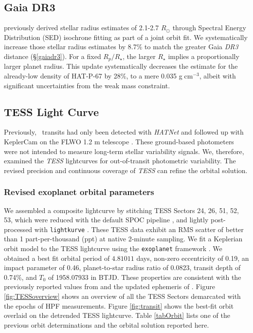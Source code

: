 \documentclass[twocolumn]{aastex631}
\newcommand{\hatpb}{\object{HAT-P-67 b}}
\begin{document}
\subsection{Gaia DR3}\label{analysisgaiaDR3}
\citet{2017AJ....153..211Z} previously derived stellar radius estimates of 2.1-2.7 $R_\odot$ through Spectral Energy Distribution (SED) isochrone fitting as part of a joint orbit fit.  We systematically increase those stellar radius estimates by 8.7\% to match the greater Gaia \emph{DR3} distance (\S \ref{gaiadr3}).  For a fixed $R_p/R_\star$, the larger $R_\star$ implies a proportionally larger planet radius. This update systematically decreases the estimate for the already-low density of HAT-P-67 by 28\%, to a mere 0.035 g$\;$cm$^{-3}$, albeit with significant uncertainties from the weak mass constraint.

\subsection{TESS Light Curve}
Previously, \hatpb~transits had only been detected with \emph{HATNet} \citep{2004PASP..116..266B} and followed up with KeplerCam on the FLWO 1.2 m telescope \citep{2017AJ....153..211Z}. These ground-based photometers were not intended to measure long-term stellar variability signals.  We, therefore, examined the \emph{TESS} lightcurves for out-of-transit photometric variability.  The revised precision and continuous coverage of \emph{TESS} can refine the orbital solution.

\subsubsection{Revised exoplanet orbital parameters}
We assembled a composite lightcurve by stitching TESS Sectors 24, 26, 51, 52, 53, which were reduced with the default SPOC pipeline \citep{2020RNAAS...4..201C}, and lightly post-processed with \texttt{lightkurve} \citep{geert_barentsen_2019_2565212}.  These TESS data exhibit an RMS scatter of better than 1 part-per-thousand (ppt) at native 2-minute sampling.  We fit a Keplerian orbit model to the TESS lightcurve using the \texttt{exoplanet} framework \citep{exoplanet:joss}.  We obtained a best fit orbital period of $4.81011$ days, non-zero eccentricity of 0.19, an impact parameter of 0.46, planet-to-star radius ratio of 0.0823, transit depth of 0.74\%, and $T_0$ of 1958.07933 in BTJD.  These properties are consistent with the previously reported values from \citet{2017AJ....153..211Z} and the updated ephemeris of \citet{2022ApJS..259...62I}.  Figure \ref{fig:TESSoverview} shows an overview of all the TESS Sectors demarcated with the epochs of HPF measurements.  Figure \ref{fig:transit} shows the best-fit orbit overlaid on the detrended TESS lightcurve.  Table \ref{tabOrbit} lists one of the previous orbit determinations and the orbital solution reported here.
\end{document}
